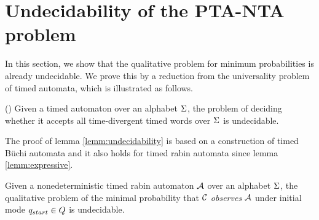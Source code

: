 \section{Undecidability of the PTA-NTA problem}
In this section, we show that the qualitative problem for minimum probabilities is already undecidable. We prove this by a reduction from the universality problem of timed automata, which is illustrated as follows.
%
%
\begin{lemma}{(\cite[Theorem 5.2.]{DBLP:conf/tapsoft/Vaandrager97})}\label{lemm:undecidability}
Given a timed automaton over an alphabet $\Sigma$, the problem of deciding whether it accepts all time-divergent timed words over $\Sigma$ is undecidable.
\end{lemma}
%
The proof of lemma \ref{lemm:undecidability} is based on a construction of timed B\"uchi automata and it also holds for timed rabin
automata since lemma \ref{lemm:expressive}.
%
\begin{proposition}
Given a nonedeterministic timed rabin automaton $\mathcal{A}$ over an alphabet $\Sigma$, the qualitative problem of
the minimal probability that $\mathcal{C}$ \emph{observes} $\mathcal{A}$ under initial mode
$q_{start} \in Q$ is undecidable.
\end{proposition}
%
